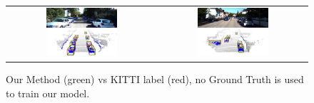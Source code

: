
\begin{figure}[h]
    \centering
    \begin{tabular}{c c}
        \includegraphics[width=0.5\textwidth]{figures/Qualitative_examples/411.png} & 
        \includegraphics[width=0.5\textwidth]{figures/Qualitative_examples/50.png} \\
         
        
 

        
    \end{tabular}
    \caption{Our Method (green) vs KITTI label (red), no Ground Truth is used to train our model. }
    \label{f:Qualitative}
\end{figure}